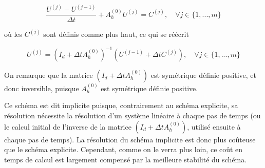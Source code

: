 \documentclass{beamer}
\begin{document}
\begin{frame}     
  \begin{equation}
   \frac{U^{(j)}-U^{(j-1)} }{\Delta t} +A_h^{(0)}U^{(j)} =C^{(j)} , \quad \forall j\in\{1,...,m\} 
   \end{equation}

où les $C^{(j)}$ sont définis comme plus haut, ce qui se réécrit

   \begin{equation}
  U^{(j)}=(I_d + \Delta t A_h^{(0)})^{-1}\left(U^{(j-1)}  +\Delta t C^{(j)} \right), \quad \forall j\in\{1,...,m\} 
   \end{equation}

 On remarque que la matrice $(I_d + \Delta t A_h^{(0)})$ est symétrique définie positive, et donc inversible, puisque $A_h^{(0)}$ est symétrique définie positive. 
 
Ce schéma est dit implicite puisque, contrairement au schéma explicite, sa résolution nécessite la résolution d'un système linéaire à chaque pas de temps (ou le calcul initial de l'inverse de la matrice $(I_d + \Delta t A_h^{(0)})$, utilisé ensuite à chaque pas de temps). La résolution du schéma implicite est donc plus coûteuse que le schéma explicite. Cependant, comme on le verra plus loin, ce coût en temps de calcul est largement compensé par la meilleure stabilité du schéma. 
  \end{frame}  
  
\end{document}
